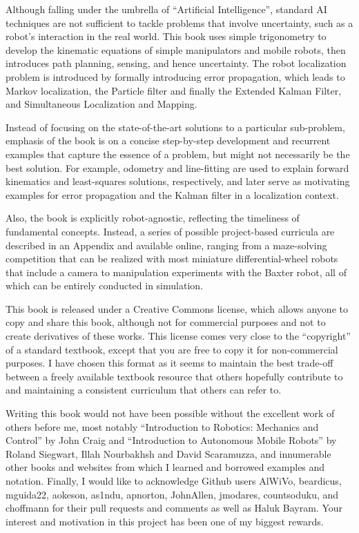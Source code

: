 \documentclass[paper=6.14in:9.21in,pagesize=pdftex,11pt,twoside,openright]{scrbook}
\begin{document}
Although falling under the umbrella of ``Artificial Intelligence'', standard AI techniques are not sufficient to tackle problems that involve uncertainty, such as a robot's interaction in the real world. This book uses simple trigonometry to develop the kinematic equations of simple manipulators and mobile robots, then introduces path planning, sensing, and hence uncertainty. The robot localization problem is introduced by formally introducing error propagation, which leads to Markov localization, the Particle filter and finally the Extended Kalman Filter, and Simultaneous Localization and Mapping.

Instead of focusing on the state-of-the-art solutions to a particular sub-problem, emphasis of the book is on a concise step-by-step development and recurrent examples that capture the essence of a problem, but might not necessarily be the best solution. For example, odometry and line-fitting are used to explain forward kinematics and least-squares solutions, respectively, and later serve as motivating examples for error propagation and the Kalman filter in a localization context.

Also, the book is explicitly robot-agnostic, reflecting the timeliness of fundamental concepts. Instead, a series of possible project-based curricula are described in an Appendix and available online, ranging from a maze-solving competition that can be realized with most miniature differential-wheel robots that include a camera to manipulation experiments with the Baxter robot, all of which can be entirely conducted in simulation.

This book is released under a Creative Commons license, which allows anyone to copy and share this book, although not for commercial purposes and not to create derivatives of these works. This license comes very close to the ``copyright'' of a standard textbook, except that you are free to copy it for non-commercial purposes. I have chosen this format as it seems to maintain the best trade-off between a freely available textbook resource that others hopefully contribute to and maintaining a consistent curriculum that others can refer to.

Writing this book would not have been possible without the excellent work of others before me, most notably ``Introduction to Robotics: Mechanics and Control'' by John Craig and ``Introduction to Autonomous Mobile Robots'' by Roland Siegwart, Illah Nourbakhsh and David Scaramuzza, and innumerable other books and websites from which I learned and borrowed examples and notation. Finally, I would like to acknowledge Github users AlWiVo, beardicus, mguida22, aokeson, as1ndu, apnorton, JohnAllen, jmodares, countsoduku, and choffmann for their pull requests and comments as well as Haluk Bayram. Your interest and motivation in this project has been one of my biggest rewards.
\end{document}
